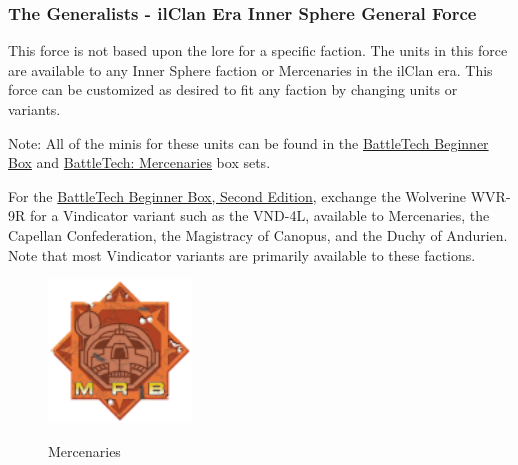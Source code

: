 \subsubsection{The Generalists - ilClan Era Inner Sphere General Force}

This force is not based upon the lore for a specific faction.
The units in this force are available to any Inner Sphere faction or Mercenaries in the ilClan era.
This force can be customized as desired to fit any faction by changing units or variants.

Note: All of the minis for these units can be found in the \href{https://www.sarna.net/wiki/BattleTech_Beginner_Box}{BattleTech Beginner Box} and \href{https://www.sarna.net/wiki/BattleTech:_Mercenaries}{BattleTech: Mercenaries} box sets.

For the \href{https://www.sarna.net/wiki/BattleTech_Beginner_Box,_Second_Edition}{BattleTech Beginner Box, Second Edition}, exchange the Wolverine WVR-9R for a Vindicator variant such as the VND-4L, available to Mercenaries, the Capellan Confederation, the Magistracy of Canopus, and the Duchy of Andurien.
Note that most Vindicator variants are primarily available to these factions.

\begin{figure}[!h]
  \centering
  \includegraphics[alt='Mercenary Logo', width=1.5in, height=1.5in]{img/Mercenary.png}
  \caption*{Mercenaries}
\end{figure}

